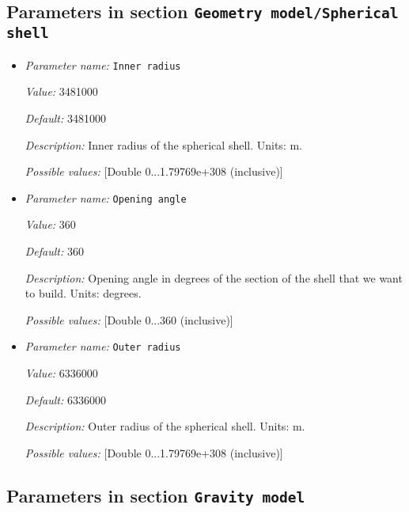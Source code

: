 \subsection{Parameters in section \tt Geometry model/Spherical shell}
\label{parameters:Geometry_20model/Spherical_20shell}

\begin{itemize}
\item {\it Parameter name:} {\tt Inner radius}


{\it Value:} 3481000


{\it Default:} 3481000


{\it Description:} Inner radius of the spherical shell. Units: m.


{\it Possible values:} [Double 0...1.79769e+308 (inclusive)]
\item {\it Parameter name:} {\tt Opening angle}


{\it Value:} 360


{\it Default:} 360


{\it Description:} Opening angle in degrees of the section of the shell that we want to build. Units: degrees.


{\it Possible values:} [Double 0...360 (inclusive)]
\item {\it Parameter name:} {\tt Outer radius}


{\it Value:} 6336000


{\it Default:} 6336000


{\it Description:} Outer radius of the spherical shell. Units: m.


{\it Possible values:} [Double 0...1.79769e+308 (inclusive)]
\end{itemize}

\subsection{Parameters in section \tt Gravity model}
\label{parameters:Gravity_20model}

